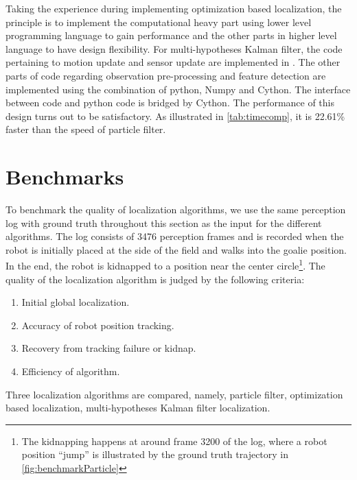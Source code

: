 Taking the experience during implementing optimization based localization, the principle is to implement the computational heavy part using lower level programming language to gain performance and the other parts in higher level language to have design flexibility.
For multi-hypotheses Kalman filter, the code pertaining to motion update and sensor update are implemented in \cpp{}. The other parts of code regarding observation pre-processing and feature detection are implemented using the combination of python, Numpy and Cython. The interface between \cpp{} code and python code is bridged by Cython. The performance of this design turns out to be satisfactory. As illustrated in \autoref{tab:timecomp}, it is 22.61\% faster than the speed of particle filter.

\section{Benchmarks}
\label{sec:Benchmark}
To benchmark the quality of localization algorithms, we use the same perception log with ground truth throughout this section as the input for the different algorithms. The log consists of 3476 perception frames and is recorded when the robot is initially placed at the side of the field and walks into the goalie position. In the end, the robot is kidnapped to a position near the center circle\footnote{The kidnapping happens at around frame 3200 of the log, where a robot position ``jump'' is illustrated by the ground truth trajectory in \autoref{fig:benchmarkParticle}}. The quality of the localization algorithm is judged by the following criteria: 
\begin{enumerate}
  \item Initial global localization.
  \item Accuracy of robot position tracking.
  \item Recovery from tracking failure or kidnap.
  \item Efficiency of algorithm.
\end{enumerate}

Three localization algorithms are compared, namely, particle filter, optimization based localization, multi-hypotheses Kalman filter localization.

